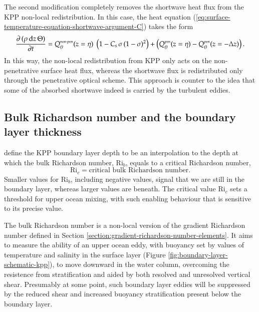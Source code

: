 The second modification completely removes the shortwave heat flux
from the KPP non-local redistribution.  In this case, the heat
equation (\ref{eq:surface-temperature-equation-shortwave-argument-C})
takes the form
\begin{equation}
 \frac{\partial \, (\rho \, \mathrm{d}z \, \Theta)}{\partial t} 
 =     Q_{\theta}^{\mbox{\tiny non-pen}}(z=\eta) \;     \left( 1 - C_{s} \, \sigma \, (1-\sigma)^{2} \right) 
    +  \left( Q_{\theta}^{\mbox{\tiny pen}}(z=\eta) - Q_{\theta}^{\mbox{\tiny pen}}(z=-\Delta z) \right). 
\label{eq:surface-temperature-equation-shortwave-argument-D} 
\end{equation}
In this way, the non-local redistribution from KPP only acts on the
non-penetrative surface heat flux, whereas the shortwave flux is
redistributed only through the penetrative optical scheme.  This
approach is counter to the idea that some of the absorbed shortwave
indeed is carried by the turbulent eddies.


\subsection{Bulk Richardson number and the boundary layer thickness}
\label{subsection:kpp-obl-thickness}

\cite{LargeKPP} define the KPP boundary layer depth to be an
interpolation to the depth at which the bulk Richardson number,
$\mbox{Ri}_{b}$, equals to a critical Richardson number,
\begin{equation}
 \mbox{Ri}_{c}  = \mbox{critical bulk Richardson number}. 
\label{eq:critical-bulk-richardson-number}
\end{equation}
Smaller values for $\mbox{Ri}_{b}$, including negative values, signal
that we are still in the boundary layer, whereas larger values are
beneath.  The critical value $\mbox{Ri}_{c}$ sets a threshold for
upper ocean mixing, with such enabling behaviour that is sensitive to
its precise value.

The bulk Richardson number is a non-local version of the gradient
Richardson number defined in Section
\ref{section:gradient-richardson-number-elements}.  It aims to measure
the ability of an upper ocean eddy, with buoyancy set by values of
temperature and salinity in the surface layer (Figure
\ref{fig:boundary-layer-schematic-kpp}), to move downward in the water
column, overcoming the resistence from stratification and aided by
both resolved and unresolved vertical shear.  Presumably at some
point, such boundary layer eddies will be suppressed by the reduced
shear and increased buoyancy stratification present below the boundary
layer.


